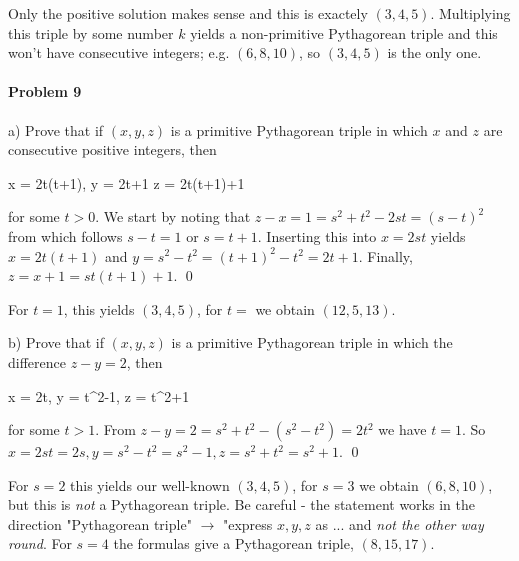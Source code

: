 Only the positive solution makes sense and this is exactely $(3,4,5)$. Multiplying this triple by some number $k$ yields a non-primitive Pythagorean triple and this won't have consecutive integers; e.g. $(6, 8, 10)$, so $(3,4,5)$ is the only one.

\paragraph{Problem 9} a) Prove that if $(x , y, z)$ is a primitive Pythagorean triple in which $x$ and $z$ are consecutive positive integers, then

\bee
x = 2t(t+1), \quad y = 2t+1 \quad z = 2t(t+1)+1
\eee

for some $t > 0$. We start by noting that $z - x = 1 = s^2+t^2 - 2st = (s-t)^2$ from which follows $s - t = 1$ or $s = t+1$. Inserting this into $x = 2st$ yields $x = 2t(t+1)$ and $y = s^2-t^2 = (t+1)^2 - t^2 = 2t+1$. Finally, $z = x+1 = st(t+1)+1$. \qed

For $t=1$, this yields $(3,4,5)$, for $t=$ we obtain $(12, 5, 13)$.

b) Prove that if $(x , y, z)$ is a primitive Pythagorean triple in which the difference $z-y = 2$, then

\bee
x = 2t, \quad y = t^2-1, \quad z = t^2+1
\eee

for some $t > 1$. From $z - y = 2 = s^2+t^2 - (s^2 - t^2) = 2t^2$ we have $t = 1$. So $x = 2st = 2s, y = s^2-t^2 = s^2-1, z = s^2 + t^2 = s^2 + 1$. \qed

For $s=2$ this yields our well-known $(3,4,5)$, for $s=3$ we obtain $(6,8,10)$, but this is \emph{not} a Pythagorean triple. Be careful - the statement works in the direction "Pythagorean triple" $\rightarrow$ "express $x,y,z$ as ... and \emph{not the other way round}. For $s=4$ the formulas give a Pythagorean triple, $(8, 15, 17)$.


